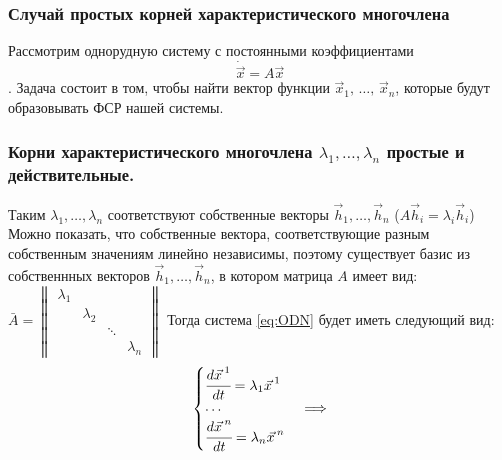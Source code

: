 \subsubsection*{Случай простых корней характеристического многочлена}
Рассмотрим однорудную систему с постоянными коэффициентами \begin{equation}
  \dot{\vec{x}} = A \vec{x} \label{eq:ODN}
\end{equation}. Задача состоит в том, чтобы найти вектор функции $\vec{x}_1, \, \dots, \, \vec{x}_n$, которые будут образовывать ФСР нашей системы. 

\subsubsection*{Корни характеристического многочлена $\lambda_1, \dots, \lambda_n$ простые и действительные.}

Таким $\lambda_1, \dots, \lambda_n$ соответствуют собственные векторы $\vec{h}_1, \dots, \vec{h}_n$ ($A \vec{h}_i = \lambda_i \vec{h}_i$)
Можно показать, что собственные вектора, соответствующие разным собственным значениям линейно независимы, 
поэтому существует базис из собственнных векторов $\vec{h}_1, \dots, \vec{h}_n$, в котором матрица $A$ имеет вид: 
$\bar{A} = \begin{Vmatrix} \lambda_1 & & & \\  & \lambda_2 & \\ & & \ddots &  \\ & & & \lambda_n \end{Vmatrix}$ 
Тогда система \eqref{eq:ODN} будет иметь следующий вид: 
\[ \begin{cases}
    \cfrac{d \vec{x\,}^1}{dt} = \lambda_1 \vec{x \,}^1 \\
    \cdots \\
    \cfrac{d \vec{x \,}^n}{dt} = \lambda_n \vec{x \,}^n
\end{cases} \Longrightarrow \]

